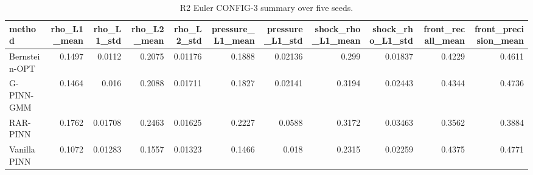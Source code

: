 \begin{table}
\caption{R2 Euler CONFIG-3 summary over five seeds.}
\label{tab:r2_euler_config3_summary}
\begin{tabular}{lrrrrrrrrrr}
\toprule
method & rho_L1_mean & rho_L1_std & rho_L2_mean & rho_L2_std & pressure_L1_mean & pressure_L1_std & shock_rho_L1_mean & shock_rho_L1_std & front_recall_mean & front_precision_mean \\
\midrule
Bernstein-OPT & 0.1497 & 0.0112 & 0.2075 & 0.01176 & 0.1888 & 0.02136 & 0.299 & 0.01837 & 0.4229 & 0.4611 \\
G-PINN-GMM & 0.1464 & 0.016 & 0.2088 & 0.01711 & 0.1827 & 0.02141 & 0.3194 & 0.02443 & 0.4344 & 0.4736 \\
RAR-PINN & 0.1762 & 0.01708 & 0.2463 & 0.01625 & 0.2227 & 0.0588 & 0.3172 & 0.03463 & 0.3562 & 0.3884 \\
Vanilla PINN & 0.1072 & 0.01283 & 0.1557 & 0.01323 & 0.1466 & 0.018 & 0.2315 & 0.02259 & 0.4375 & 0.4771 \\
\bottomrule
\end{tabular}
\end{table}
